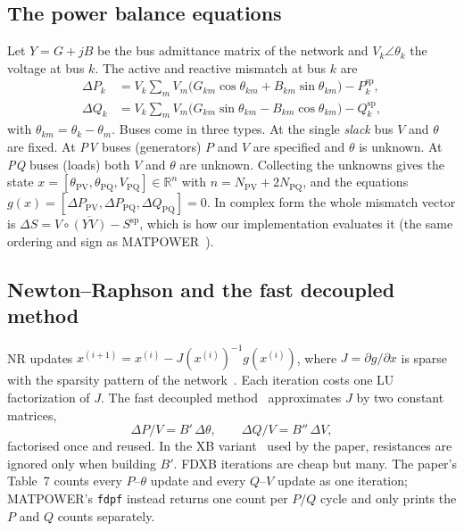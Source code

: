\documentclass[11pt,a4paper]{article}
\newcommand{\code}[1]{\texttt{#1}}
\begin{document}
\subsection{The power balance equations}
Let $Y = G + jB$ be the bus admittance matrix of the network and $V_k\angle\theta_k$ the voltage at bus
$k$. The active and reactive mismatch at bus $k$ are
\begin{align}
  \Delta P_k &= V_k \sum_{m} V_m\bigl(G_{km}\cos\theta_{km} + B_{km}\sin\theta_{km}\bigr) - P_k^{\mathrm{sp}}, \label{eq:p}\\
  \Delta Q_k &= V_k \sum_{m} V_m\bigl(G_{km}\sin\theta_{km} - B_{km}\cos\theta_{km}\bigr) - Q_k^{\mathrm{sp}}, \label{eq:q}
\end{align}
with $\theta_{km}=\theta_k-\theta_m$. Buses come in three types. At the single \emph{slack} bus $V$ and
$\theta$ are fixed. At \emph{PV} buses (generators) $P$ and $V$ are specified and $\theta$ is unknown.
At \emph{PQ} buses (loads) both $V$ and $\theta$ are unknown. Collecting the unknowns gives the state
$x=[\theta_{\mathrm{PV}},\theta_{\mathrm{PQ}},V_{\mathrm{PQ}}]\in\mathbb{R}^n$ with $n=N_{\mathrm{PV}}+2N_{\mathrm{PQ}}$,
and the equations $g(x)=[\Delta P_{\mathrm{PV}},\Delta P_{\mathrm{PQ}},\Delta Q_{\mathrm{PQ}}]=0$.
In complex form the whole mismatch vector is $\Delta S = V\circ\overline{(YV)} - S^{\mathrm{sp}}$, which is
how our implementation evaluates it (the same ordering and sign as MATPOWER~\cite{matpower}).

\subsection{Newton--Raphson and the fast decoupled method}
NR updates $x^{(i+1)} = x^{(i)} - J(x^{(i)})^{-1} g(x^{(i)})$, where $J=\partial g/\partial x$ is sparse
with the sparsity pattern of the network~\cite{tinney1967}. Each iteration costs one LU factorization of
$J$. The fast decoupled method~\cite{stott1974} approximates $J$ by two constant matrices,
\begin{equation}
  \Delta P / V = B'\,\Delta\theta, \qquad \Delta Q / V = B''\,\Delta V,
\end{equation}
factorised once and reused. In the XB variant~\cite{vanamerongen1989} used by the paper, resistances are
ignored only when building $B'$. FDXB iterations are cheap but many. The paper's Table~7 counts every
$P$--$\theta$ update and every $Q$--$V$ update as one iteration; MATPOWER's \code{fdpf} instead returns one
count per $P/Q$ cycle and only prints the $P$ and $Q$ counts separately.
\end{document}
